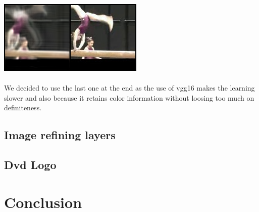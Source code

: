 \documentclass[11pt, a4paper]{article}
\begin{document}
	\includegraphics{sobel_color}\\ \\
	We decided to use the last one at the end as the use of vgg16 makes the learning slower and also because it retains color information without loosing too much on definiteness.

	\subsection{Image refining layers}
	\subsection{Dvd Logo}
	
	\section{Conclusion}
	
	
	
	
\end{document}
